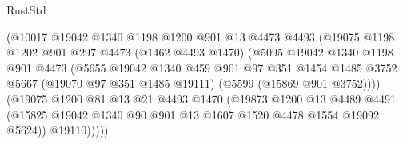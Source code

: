 \begin{lexlean}{RustStd}
\begin{coremodule}
                              (@10017
                                @19042
                                @1340
                                @1198
                                @1200
                                @901
                                @13
                                @4473
                                @4493
                                (@19075
                                  @1198
                                  @1202
                                  @901
                                  @297
                                  @4473
                                  (@1462 @4493 @1470)
                                  (@5095
                                    @19042
                                    @1340
                                    @1198
                                    @901
                                    @4473
                                    (@5655
                                      @19042
                                      @1340
                                      @459
                                      @901
                                      @97
                                      @351
                                      @1454
                                      @1485
                                      @3752
                                      @5667
                                      (@19070 @97 @351 @1485 @19111)
                                      (@5599 (@15869 @901 @3752))))
                                  (@19075
                                    @1200
                                    @81
                                    @13
                                    @21
                                    @4493
                                    @1470
                                    (@19873
                                      @1200
                                      @13
                                      @4489
                                      @4491
                                      (@15825
                                        @19042
                                        @1340
                                        @90
                                        @901
                                        @13
                                        @1607
                                        @1520
                                        @4478
                                        @1554
                                        @19092
                                        @5624))
                                    @19110)))))

\end{coremodule}
\end{lexlean}
